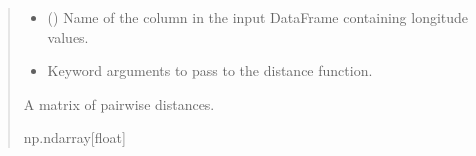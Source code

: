 \documentclass[letterpaper,10pt,english]{sphinxmanual}
\begin{document}
\begin{fulllineitems}
\begin{quote}
\begin{description}
\begin{itemize}
\item {}
\sphinxAtStartPar
{} () \textendash{} Name of the column in the input DataFrame containing longitude values.

\item {}
\sphinxAtStartPar
{} \textendash{} Keyword arguments to pass to the distance function.

\end{itemize}

\sphinxAtStartPar
{} \textendash{} A matrix of pairwise distances.

\sphinxAtStartPar
np.ndarray{[}float{]}

\end{description}\end{quote}

\end{fulllineitems}

\end{document}
